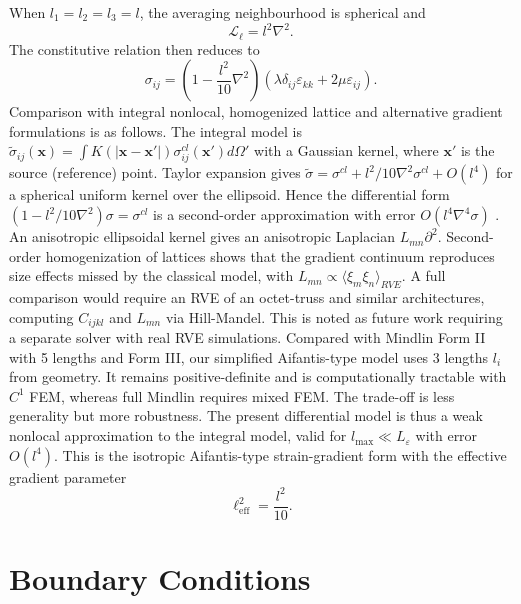 \documentclass[final,3p,times,fleqn]{elsarticle}
\begin{document}
When $l_1=l_2=l_3=l$, the averaging neighbourhood is spherical and
\begin{equation}\label{eq:spherical_operator}
\mathcal{L}_{\ell}
=
l^2\nabla^2.
\end{equation}
The constitutive relation then reduces to
\begin{equation}\label{eq:spherical}
\sigma_{ij}
=
\left(
1-\frac{l^2}{10}\nabla^2
\right)
\left(
\lambda\delta_{ij}\varepsilon_{kk}
+
2\mu\varepsilon_{ij}
\right).
\end{equation}
Comparison with integral nonlocal, homogenized lattice and alternative gradient formulations is as follows. The integral model is $\tilde{\sigma}_{ij}(\mathbf{x})=\int K(|\mathbf{x}-\mathbf{x}'|)\sigma^{cl}_{ij}(\mathbf{x}')d\Omega'$ with a Gaussian kernel, where $\mathbf{x}'$ is the source (reference) point. Taylor expansion gives $\tilde{\sigma}=\sigma^{cl}+l^2/10\nabla^2\sigma^{cl}+O(l^4)$ for a spherical uniform kernel over the ellipsoid. Hence the differential form $(1- l^2/10\nabla^2)\sigma=\sigma^{cl}$ is a second-order approximation with error $O(l^4\nabla^4\sigma)$ \cite{Eringen1983,AskesAifantis2011}. An anisotropic ellipsoidal kernel gives an anisotropic Laplacian $L_{mn}\partial^2$. Second-order homogenization of lattices \cite{Molavitabrizi2023} shows that the gradient continuum reproduces size effects missed by the classical model, with $L_{mn}\propto\langle\xi_m\xi_n\rangle_{RVE}$. A full comparison would require an RVE of an octet-truss and similar architectures, computing $C_{ijkl}$ and $L_{mn}$ via Hill-Mandel. This is noted as future work requiring a separate solver with real RVE simulations. Compared with Mindlin Form II with 5 lengths and Form III, our simplified Aifantis-type model uses 3 lengths $l_i$ from geometry. It remains positive-definite and is computationally tractable with $C^1$ FEM, whereas full Mindlin requires mixed FEM. The trade-off is less generality but more robustness. The present differential model is thus a weak nonlocal approximation to the integral model, valid for $l_{\max}\ll L_{\varepsilon}$ with error $O(l^4)$.
This is the isotropic Aifantis-type strain-gradient form
\cite{Aifantis1992,AltanAifantis1997,AskesAifantis2011} with the
effective gradient parameter
\begin{equation}\label{eq:effective_length}
\ell_{\mathrm{eff}}^2
=
\frac{l^2}{10}.
\end{equation}

\section{Boundary Conditions}
\label{sec:boundary_conditions}
\end{document}

